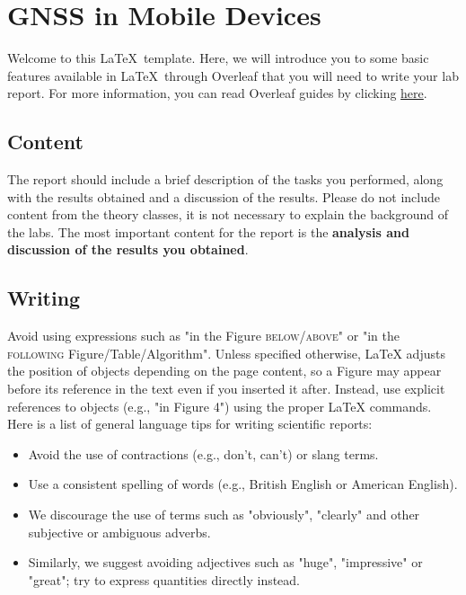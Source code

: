 \section{GNSS in Mobile Devices}
%
Welcome to this \LaTeX\ template. Here, we will introduce you to some basic features available in \LaTeX\ through Overleaf that you will need to write your lab report. For more information, you can read Overleaf guides by clicking \href{https://www.overleaf.com/learn}{here}. 
%
\subsection{Content}
The report should include a brief description of the tasks you performed, along with the results obtained and a discussion of the results. Please do not include content from the theory classes, it is not necessary to explain the background of the labs. The most important content for the report is the \textbf{analysis and discussion of the results you obtained}.
%
\subsection{Writing}
%
Avoid using expressions such as "in the Figure \textsc{below/above}" or "in the \textsc{following} Figure/Table/Algorithm". Unless specified otherwise, LaTeX adjusts the position of objects depending on the page content, so a Figure may appear before its reference in the text even if you inserted it after. Instead, use explicit references to objects (e.g., "in Figure 4") using the proper LaTeX commands. \\
Here is a list of general language tips for writing scientific reports: 
\begin{itemize}
    \item Avoid the use of contractions (e.g., don’t, can’t) or slang terms.
    \item Use a consistent spelling of words (e.g., British English or American English).
    \item We discourage the use of terms such as "obviously", "clearly" and other subjective or ambiguous adverbs. 
    \item Similarly, we suggest avoiding adjectives such as "huge", "impressive" or "great"; try to express quantities directly instead. \\
\end{itemize}
%
